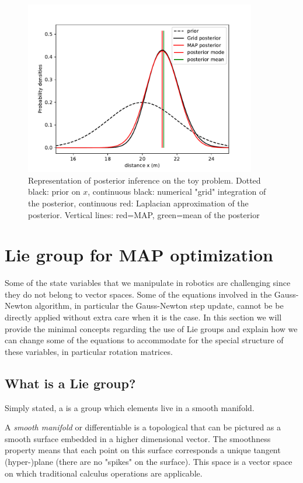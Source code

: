 \begin{figure}[h]
    \centering
    \includegraphics[width=0.9\textwidth]{figures/MAP_stereo1D.pdf}
    \caption{Representation of posterior inference on the toy problem. Dotted black: prior on $x$, 
    continuous black: numerical "grid" integration of the posterior, continuous red: Laplacian approximation of the posterior. Vertical lines: red=MAP, green=mean of the posterior
    }
    \label{fig:MAP_stereo1D}
 \end{figure}




\section{Lie group for MAP optimization}
Some of the state variables that we manipulate in robotics are challenging since they do not belong to vector spaces. Some of the equations
involved in the Gauss-Newton algorithm, in particular the Gauss-Newton step update, cannot be be directly applied without extra care when it is the case.
In this section we will provide the minimal concepts regarding the use of Lie groups and explain how we can change some of the equations
to accommodate for the special structure of these variables, in particular rotation matrices.

\subsection{What is a Lie group?}
Simply stated, a  is a group which elements live in a smooth manifold.

A \textit{smooth manifold} or differentiable is a topological that can be pictured as a smooth surface embedded in a higher dimensional vector.
The smoothness property means that each point on this surface corresponds a unique tangent (hyper-)plane (there are no "spikes" on the surface).
This space is a vector space on which traditional calculus operations are applicable.

